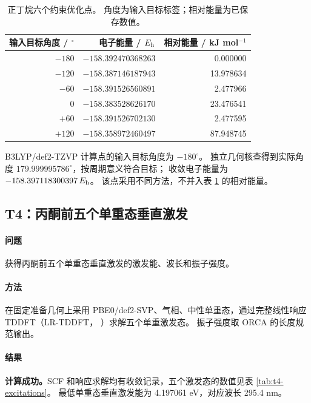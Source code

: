 \begin{table}[H]
  \centering\small
  \caption{正丁烷六个约束优化点。%
  角度为输入目标标签；相对能量为已保存数值。%
  }
  \label{tab:t3-energies}
  \begin{tabular}{rrr}
    \toprule
    输入目标角度 / $^\circ$ & 电子能量 / $E_{\mathrm h}$ & 相对能量 / kJ mol$^{-1}$\\
    \midrule
    $-180$ & $-158.392470368263$ & 0.000000\\
    $-120$ & $-158.387146187943$ & 13.978634\\
    $-60$ & $-158.391526560891$ & 2.477966\\
    $0$ & $-158.383528626170$ & 23.476541\\
    $+60$ & $-158.391526702130$ & 2.477595\\
    $+120$ & $-158.358972460497$ & 87.948745\\
    \bottomrule
  \end{tabular}
\end{table}

B3LYP/def2-TZVP 计算点的输入目标角度为 $-180^\circ$。%
独立几何核查得到实际角度 $179.999995786^\circ$，按周期意义符合目标；%
收敛电子能量为 $-158.397118300397\,E_{\mathrm h}$。%
该点采用不同方法，不并入表 \ref{tab:t3-energies} 的相对能量。

\subsection{T4：丙酮前五个单重态垂直激发}
\paragraph{问题}
获得丙酮前五个单重态垂直激发的激发能、波长和振子强度。

\paragraph{方法}
在固定准备几何上采用 PBE0/def2-SVP、气相、中性单重态，通过完整线性响应 TDDFT（LR-TDDFT，%
）求解五个单重激发态。%
振子强度取 ORCA 的长度规范输出。

\paragraph{结果}
\textbf{计算成功。}SCF 和响应求解均有收敛记录，五个激发态的数值见表 \ref{tab:t4-excitations}。%
最低单重态垂直激发能为 4.197061 eV，对应波长 295.4 nm。

